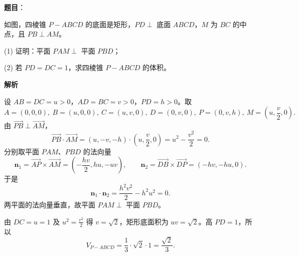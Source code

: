 \begin{answer}

\textbf{题目}：

如图，四棱锥 $P-ABCD$ 的底面是矩形，$PD\perp$ 底面 $ABCD$，$M$ 为 $BC$ 的中点，且 $PB\perp AM$。
\nopagebreak[4]
\begin{center}\end{center}
\nopagebreak[4]
(1) 证明：平面 $PAM\perp$ 平面 $PBD$；

(2) 若 $PD=DC=1$，求四棱锥 $P-ABCD$ 的体积。

\textbf{解析}


设 $AB=DC=u>0$，$AD=BC=v>0$，$PD=h>0$。取
\nopagebreak[4]
\[
A=(0,0,0),\ B=(u,0,0),\ C=(u,v,0),\ D=(0,v,0),\
P=(0,v,h),\ M=\left(u,\frac v2,0\right).
\]
由 $\overrightarrow{PB}\perp\overrightarrow{AM}$，
\nopagebreak[4]
\[
\overrightarrow{PB}\cdot\overrightarrow{AM}
=(u,-v,-h)\cdot\left(u,\frac v2,0\right)
=u^2-\frac{v^2}{2}=0.
\]
分别取平面 $PAM$、$PBD$ 的法向量
\nopagebreak[4]
\[
\boldsymbol n_1=\overrightarrow{AP}\times\overrightarrow{AM}
=\left(-\frac{hv}{2},hu,-uv\right),\qquad
\boldsymbol n_2=\overrightarrow{DB}\times\overrightarrow{DP}
=(-hv,-hu,0).
\]
于是
\nopagebreak[4]
\[
\boldsymbol n_1\cdot\boldsymbol n_2
=\frac{h^2v^2}{2}-h^2u^2=0.
\]
两平面的法向量垂直，故平面 $PAM\perp$ 平面 $PBD$。


由 $DC=u=1$ 及 $u^2=\frac{v^2}{2}$ 得 $v=\sqrt2$，矩形底面积为 $uv=\sqrt2$。高 $PD=1$，所以
\nopagebreak[4]
\[
V_{P-ABCD}=\frac13\cdot\sqrt2\cdot1=\frac{\sqrt2}{3}.
\]



\end{answer}
